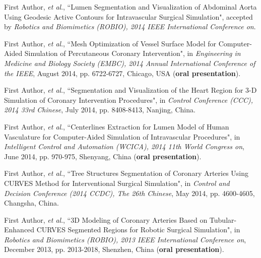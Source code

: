 
\begin{publications}{99}

\item First Author, \textit{et al}., ``Lumen Segmentation and Visualization of Abdominal Aorta Using Geodesic Active Contours for Intravascular Surgical Simulation", accepted by \textit{Robotics and Biomimetics (ROBIO), 2014 IEEE International Conference on}.%

\item First Author, \textit{et al}., ``Mesh Optimization of Vessel Surface Model for Computer-Aided Simulation of Percutaneous Coronary Intervention", in \textit{Engineering in Medicine and Biology Society (EMBC), 2014 Annual International Conference of the IEEE}, August 2014, pp. 6722-6727, Chicago, USA (\textbf{oral presentation}).%

\item First Author, \textit{et al}., ``Segmentation and Visualization of the Heart Region for 3-D Simulation of Coronary Intervention Procedures", in \textit{Control Conference (CCC), 2014 33rd Chinese}, July 2014, pp. 8408-8413, Nanjing, China.%

\item First Author, \textit{et al}., ``Centerlines Extraction for Lumen Model of Human Vasculature for Computer-Aided Simulation of Intravascular Procedures", in \textit{Intelligent Control and Automation (WCICA), 2014 11th World Congress on}, June 2014, pp. 970-975, Shenyang, China (\textbf{oral presentation}).%

\item First Author, \textit{et al}., ``Tree Structures Segmentation of Coronary Arteries Using CURVES Method for Interventional Surgical Simulation", in \textit{Control and Decision Conference (2014 CCDC), The 26th Chinese}, May 2014, pp. 4600-4605, Changsha, China.%

\item First Author, \textit{et al}., ``3D Modeling of Coronary Arteries Based on Tubular-Enhanced CURVES Segmented Regions for Robotic Surgical Simulation", in \textit{Robotics and Biomimetics (ROBIO), 2013 IEEE International Conference on}, December 2013, pp. 2013-2018, Shenzhen, China (\textbf{oral presentation}).%


\end{publications}
